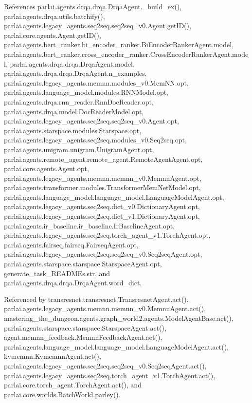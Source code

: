 References parlai.\+agents.\+drqa.\+drqa.\+Drqa\+Agent.\+\_\+build\+\_\+ex(), parlai.\+agents.\+drqa.\+utils.\+batchify(), parlai.\+agents.\+legacy\+\_\+agents.\+seq2seq.\+seq2seq\+\_\+v0.\+Agent.\+get\+I\+D(), parlai.\+core.\+agents.\+Agent.\+get\+I\+D(), parlai.\+agents.\+bert\+\_\+ranker.\+bi\+\_\+encoder\+\_\+ranker.\+Bi\+Encoder\+Ranker\+Agent.\+model, parlai.\+agents.\+bert\+\_\+ranker.\+cross\+\_\+encoder\+\_\+ranker.\+Cross\+Encoder\+Ranker\+Agent.\+model, parlai.\+agents.\+drqa.\+drqa.\+Drqa\+Agent.\+model, parlai.\+agents.\+drqa.\+drqa.\+Drqa\+Agent.\+n\+\_\+examples, parlai.\+agents.\+legacy\+\_\+agents.\+memnn.\+modules\+\_\+v0.\+Mem\+N\+N.\+opt, parlai.\+agents.\+language\+\_\+model.\+modules.\+R\+N\+N\+Model.\+opt, parlai.\+agents.\+drqa.\+rnn\+\_\+reader.\+Rnn\+Doc\+Reader.\+opt, parlai.\+agents.\+drqa.\+model.\+Doc\+Reader\+Model.\+opt, parlai.\+agents.\+legacy\+\_\+agents.\+seq2seq.\+seq2seq\+\_\+v0.\+Agent.\+opt, parlai.\+agents.\+starspace.\+modules.\+Starspace.\+opt, parlai.\+agents.\+legacy\+\_\+agents.\+seq2seq.\+modules\+\_\+v0.\+Seq2seq.\+opt, parlai.\+agents.\+unigram.\+unigram.\+Unigram\+Agent.\+opt, parlai.\+agents.\+remote\+\_\+agent.\+remote\+\_\+agent.\+Remote\+Agent\+Agent.\+opt, parlai.\+core.\+agents.\+Agent.\+opt, parlai.\+agents.\+legacy\+\_\+agents.\+memnn.\+memnn\+\_\+v0.\+Memnn\+Agent.\+opt, parlai.\+agents.\+transformer.\+modules.\+Transformer\+Mem\+Net\+Model.\+opt, parlai.\+agents.\+language\+\_\+model.\+language\+\_\+model.\+Language\+Model\+Agent.\+opt, parlai.\+agents.\+legacy\+\_\+agents.\+seq2seq.\+dict\+\_\+v0.\+Dictionary\+Agent.\+opt, parlai.\+agents.\+legacy\+\_\+agents.\+seq2seq.\+dict\+\_\+v1.\+Dictionary\+Agent.\+opt, parlai.\+agents.\+ir\+\_\+baseline.\+ir\+\_\+baseline.\+Ir\+Baseline\+Agent.\+opt, parlai.\+agents.\+legacy\+\_\+agents.\+seq2seq.\+torch\+\_\+agent\+\_\+v1.\+Torch\+Agent.\+opt, parlai.\+agents.\+fairseq.\+fairseq.\+Fairseq\+Agent.\+opt, parlai.\+agents.\+legacy\+\_\+agents.\+seq2seq.\+seq2seq\+\_\+v0.\+Seq2seq\+Agent.\+opt, parlai.\+agents.\+starspace.\+starspace.\+Starspace\+Agent.\+opt, generate\+\_\+task\+\_\+\+R\+E\+A\+D\+M\+Es.\+str, and parlai.\+agents.\+drqa.\+drqa.\+Drqa\+Agent.\+word\+\_\+dict.



Referenced by transresnet.\+transresnet.\+Transresnet\+Agent.\+act(), parlai.\+agents.\+legacy\+\_\+agents.\+memnn.\+memnn\+\_\+v0.\+Memnn\+Agent.\+act(), mastering\+\_\+the\+\_\+dungeon.\+agents.\+graph\+\_\+world2.\+agents.\+Model\+Agent\+Base.\+act(), parlai.\+agents.\+starspace.\+starspace.\+Starspace\+Agent.\+act(), agent.\+memnn\+\_\+feedback.\+Memnn\+Feedback\+Agent.\+act(), parlai.\+agents.\+language\+\_\+model.\+language\+\_\+model.\+Language\+Model\+Agent.\+act(), kvmemnn.\+Kvmemnn\+Agent.\+act(), parlai.\+agents.\+legacy\+\_\+agents.\+seq2seq.\+seq2seq\+\_\+v0.\+Seq2seq\+Agent.\+act(), parlai.\+agents.\+legacy\+\_\+agents.\+seq2seq.\+torch\+\_\+agent\+\_\+v1.\+Torch\+Agent.\+act(), parlai.\+core.\+torch\+\_\+agent.\+Torch\+Agent.\+act(), and parlai.\+core.\+worlds.\+Batch\+World.\+parley().


